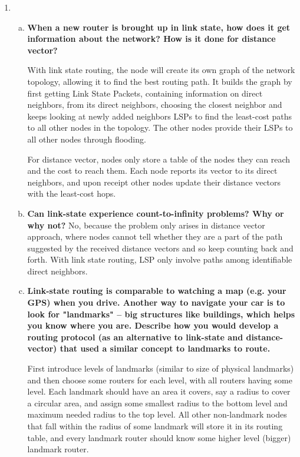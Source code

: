 \documentclass[11pt]{article}
\begin{document}
\begin{enumerate}[1.]

\item %
  \begin{enumerate}[(a)]
  
  \item 
  \textbf{
    When a new router is brought up in link state, how does it get information about the network? How is it done for distance vector?
  } 

    With link state routing, the node will create its own graph of the network topology, allowing it to find the best routing path. It builds the graph by first getting Link State Packets, containing information on direct neighbors, from its direct neighbors, choosing the closest neighbor and keeps looking at newly added neighbors LSPs to find the least-cost paths to all other nodes in the topology. The other nodes provide their LSPs to all other nodes through flooding.

    For distance vector, nodes only store a table of the nodes they can reach and the cost to reach them. Each node reports its vector to its direct neighbors, and upon receipt other nodes update their distance vectors with the least-cost hops.

  \item 
  \textbf{
    Can link-state experience count-to-infinity problems? Why or why not? 
  } 
    No, because the problem only arises in distance vector approach, where nodes cannot tell whether they are a part of the path suggested by the received distance vectors and so keep counting back and forth. With link state routing, LSP only involve paths among identifiable direct neighbors.

  \item 
  \textbf{
    Link-state routing is comparable to watching a map (e.g. your GPS) when you drive. Another way to navigate your car is to look for "landmarks" – big structures like buildings, which helps you know where you are. Describe how you would develop a routing protocol (as an alternative to link-state and distance-vector) that used a similar concept to landmarks to route. 
  } 

    First introduce levels of landmarks (similar to size of physical landmarks) and then choose some routers for each level, with all routers having some level. Each landmark should have an area it covers, say a radius to cover a circular area, and assign some smallest radius to the bottom level and maximum needed radius to the top level. All other non-landmark nodes that fall within the radius of some landmark will store it in its routing table, and every landmark router should know some higher level (bigger) landmark router.


\end{enumerate}
\end{enumerate}
\end{document}
